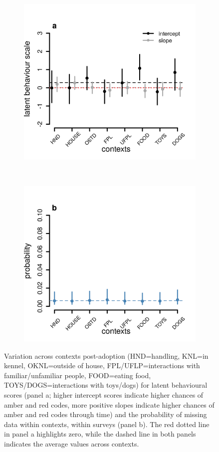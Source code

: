 \documentclass[12pt]{article}
\begin{document}
\begin{figure}[]
  \centering
  \begin{subfigure}{0.5\textwidth}
    \includegraphics[scale=0.6]{figures/figure_S2_a}
  \end{subfigure}%
  ~
  \begin{subfigure}{0.5\textwidth}
    \includegraphics[scale=0.6]{figures/figure_S2_b}
  \end{subfigure}%
\caption{Variation across contexts post-adoption  (HND=handling, KNL=in kennel, OKNL=outside of house, FPL/UFLP=interactions with familiar/unfamiliar people, FOOD=eating food, TOYS/DOGS=interactions with toys/dogs) for latent behavioural scores (panel a; higher intercept scores indicate higher chances of amber and red codes, more positive slopes indicate higher chances of amber and red codes through time) and the probability of missing data within contexts, within surveys (panel b). The red dotted line in panel a highlights zero, while the dashed line in both panels indicates the average values across contexts.
}
\label{fig_2}
\end{figure}
\end{document}
